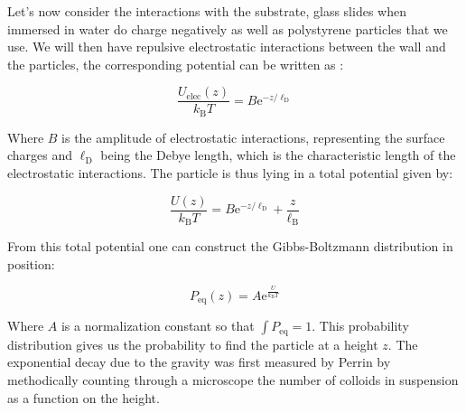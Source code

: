 Let's now consider the interactions with the substrate, glass slides when immersed in water do charge negatively as well as polystyrene particles that we use. We will then have repulsive electrostatic interactions between the wall and the particles, the corresponding potential can be written as  \cite{israelachvili_intermolecular_2015}:

\begin{equation}
	\frac{U_\mathrm{elec}(z)}{k_\mathrm{B}T} = B \mathrm{e}^{-z/\ell_\mathrm{D}}
\end{equation}


Where $B$ is the amplitude of electrostatic interactions, representing the surface charges and $\ell_\mathrm{D}$ being the Debye length, which is the characteristic length of the electrostatic interactions. The particle is thus lying in a total potential given by:

\begin{equation}
	\frac{U(z)}{k_\mathrm{B}T} =   B \mathrm{e}^{-z/\ell_\mathrm{D}} +  \frac{z}{\ell_\mathrm{B}}
\end{equation}

From this total potential one can construct the Gibbs-Boltzmann distribution in position:

\begin{equation}
	P_\mathrm{eq}(z) = A\mathrm{e}^
	{
		\frac{U}{k_\mathrm{B}T}	
	}
\end{equation}

Where $A$ is a normalization constant so that $\int P_\mathrm{eq} = 1$. This probability distribution gives us the probability to find the particle at a height $z$. The exponential decay due to the gravity was first measured by Perrin \cite{perrin_les_2014} by methodically counting through a microscope the number of colloids in suspension as a function on the height. 